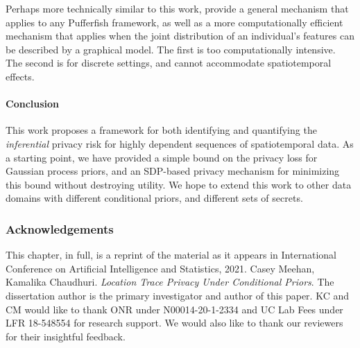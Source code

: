 Perhaps more technically similar to this work, \cite{song_pufferfish_2017} provide a general mechanism that applies to any Pufferfish framework, as well as a more computationally efficient mechanism that applies when the joint distribution of an individual's features can be described by a graphical model. The first is too computationally intensive. The second is for discrete settings, and cannot accommodate spatiotemporal effects.

\paragraph{Conclusion}
This work proposes a framework for both identifying and quantifying the \emph{inferential} privacy risk for highly dependent sequences of spatiotemporal data. As a starting point, we have provided a simple bound on the privacy loss for Gaussian process priors, and an SDP-based privacy mechanism for minimizing this bound without destroying utility. We hope to extend this work to other data domains with different conditional priors, and different sets of secrets.

\subsubsection*{Acknowledgements}
This chapter, in full, is a reprint of the material as it appears in International Conference on Artificial Intelligence and Statistics, 2021. Casey Meehan, Kamalika Chaudhuri. \emph{Location Trace Privacy Under Conditional Priors}. The dissertation author is the primary investigator and author of this paper. 
KC and CM would like to thank ONR under N00014-20-1-2334 and UC Lab Fees under LFR 18-548554  for research support. We would also like to thank our reviewers for their insightful feedback. 